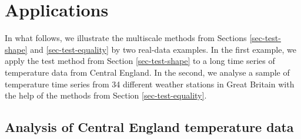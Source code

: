 


\section{Applications}\label{sec-data}


In what follows, we illustrate the multiscale methods from Sections \ref{sec-test-shape} and \ref{sec-test-equality} by two real-data examples. In the first example, we apply the test method from Section \ref{sec-test-shape} to a long time series of temperature data from Central England. In the second, we analyse a sample of temperature time series from 34 different weather stations in Great Britain with the help of the methods from Section \ref{sec-test-equality}. 


\subsection{Analysis of Central England temperature data}\label{subsec-data-1} 


